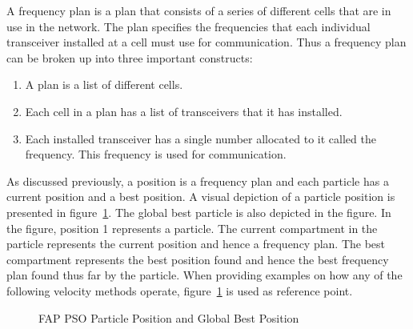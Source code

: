 A frequency plan is a plan that consists of a series of different cells that are in use in the network. The plan specifies the frequencies that each individual transceiver installed at a cell must use for communication. Thus a frequency plan can be broken up into three important constructs:
\begin{enumerate}
\item A plan is a list of different cells.
\item Each cell in a plan has a list of transceivers that it has installed.
\item Each installed transceiver has a single number allocated to it called the frequency. This frequency is used for communication.
\end{enumerate}

As discussed previously, a position is a frequency plan and each particle has a current position and a best position. A visual depiction of a particle position is presented in figure~\ref{fig:fapparticlepos}. The global best particle is also depicted in the figure. In the figure, position 1 represents a particle. The current compartment in the particle represents the current position and hence a frequency plan. The best compartment represents the best position found and hence the best frequency plan found thus far by the particle. When providing examples on how any of the following velocity methods operate, figure~\ref{fig:fapparticlepos} is used as reference point.
\begin{figure}[ht]
	\centering
	\setlength \fboxsep{0pt}
	\setlength \fboxrule{0.5pt}
	\caption{FAP PSO Particle Position and Global Best Position}
	\label{fig:fapparticlepos}
\end{figure}

